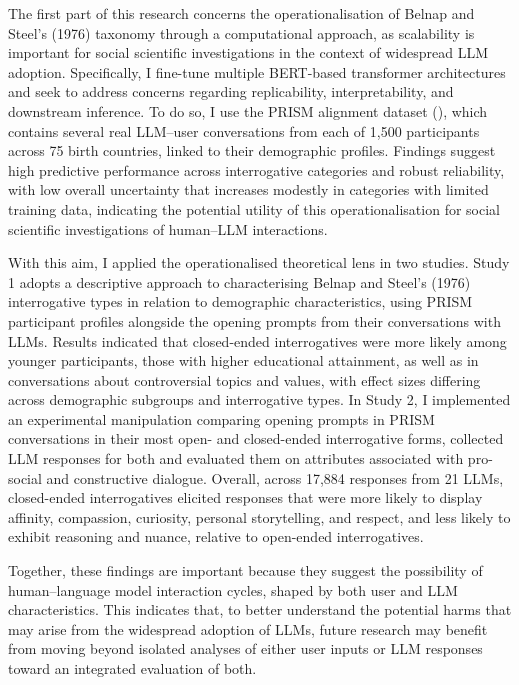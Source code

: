 \documentclass[
  12pt,
]{article}
\begin{document}
The first part of this research concerns the operationalisation of Belnap and Steel's (1976) taxonomy through a computational approach, as scalability is important for social scientific investigations in the context of widespread LLM adoption. Specifically, I fine-tune multiple BERT-based transformer architectures and seek to address concerns regarding replicability, interpretability, and downstream inference. To do so, I use the PRISM alignment dataset (), which contains several real LLM--user conversations from each of 1,500 participants across 75 birth countries, linked to their demographic profiles. Findings suggest high predictive performance across interrogative categories and robust reliability, with low overall uncertainty that increases modestly in categories with limited training data, indicating the potential utility of this operationalisation for social scientific investigations of human--LLM interactions.

With this aim, I applied the operationalised theoretical lens in two studies. Study 1 adopts a descriptive approach to characterising Belnap and Steel's (1976) interrogative types in relation to demographic characteristics, using PRISM participant profiles alongside the opening prompts from their conversations with LLMs. Results indicated that closed-ended interrogatives were more likely among younger participants, those with higher educational attainment, as well as in conversations about controversial topics and values, with effect sizes differing across demographic subgroups and interrogative types. In Study 2, I implemented an experimental manipulation comparing opening prompts in PRISM conversations in their most open- and closed-ended interrogative forms, collected LLM responses for both and evaluated them on attributes associated with pro-social and constructive dialogue. Overall, across 17,884 responses from 21 LLMs, closed-ended interrogatives elicited responses that were more likely to display affinity, compassion, curiosity, personal storytelling, and respect, and less likely to exhibit reasoning and nuance, relative to open-ended interrogatives.

Together, these findings are important because they suggest the possibility of human--language model interaction cycles, shaped by both user and LLM characteristics. This indicates that, to better understand the potential harms that may arise from the widespread adoption of LLMs, future research may benefit from moving beyond isolated analyses of either user inputs or LLM responses toward an integrated evaluation of both.
\end{document}
